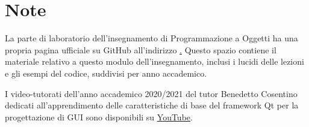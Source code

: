 \documentclass[10pt,a4paper,oneside]{article}
\begin{document}
\section{Note}
La parte di laboratorio dell'insegnamento di Programmazione a Oggetti ha una propria pagina ufficiale su GitHub all'indirizzo \href{https://github.com/Unipd-Object-Oriented-Programming}. Questo spazio contiene il materiale relativo a questo modulo dell'insegnamento, inclusi i lucidi delle lezioni e gli esempi del codice, suddivisi per anno accademico.

I video-tutorati dell'anno accademico 2020/2021 del tutor Benedetto Cosentino dedicati all'apprendimento delle caratteristiche di base del framework Qt per la progettazione di GUI sono disponibili su \href{https://www.youtube.com/playlist?list=PLH_Fd-836q-VcqWnnzsq3GOF2-0i_Az7p}{YouTube}.
\end{document}
